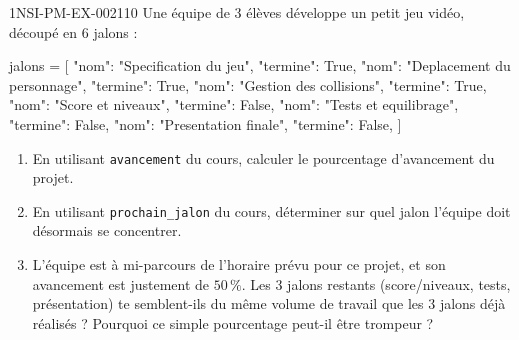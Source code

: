 \begin{exercice}{1NSI-PM-EX-002}{1}{10}
Une équipe de $3$ élèves développe un petit jeu vidéo, découpé en $6$ jalons :
\begin{python}
jalons = [
    {"nom": "Specification du jeu", "termine": True},
    {"nom": "Deplacement du personnage", "termine": True},
    {"nom": "Gestion des collisions", "termine": True},
    {"nom": "Score et niveaux", "termine": False},
    {"nom": "Tests et equilibrage", "termine": False},
    {"nom": "Presentation finale", "termine": False},
]
\end{python}
\begin{enumerate}
  \item En utilisant \lstinline{avancement} du cours, calculer le pourcentage d'avancement du projet.
  \item En utilisant \lstinline{prochain_jalon} du cours, déterminer sur quel jalon l'équipe doit désormais se concentrer.
  \item L'équipe est à mi-parcours de l'horaire prévu pour ce projet, et son avancement est justement de $50\,\%$. Les $3$ jalons restants (score/niveaux, tests, présentation) te semblent-ils du même volume de travail que les $3$ jalons déjà réalisés ? Pourquoi ce simple pourcentage peut-il être trompeur ?
\end{enumerate}
\end{exercice}

